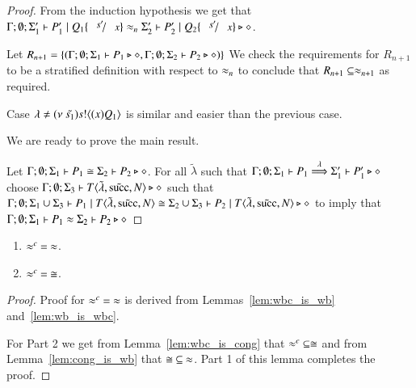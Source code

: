 \begin{proof}
	From the induction hypothesis we get that
	$\Gamma;\emptyset; \Sigma_1' \proves P_1' \Par Q_1 \subst{s'}{x} \wb_n \Sigma_2' \proves P_2' \Par Q_2 \subst{s'}{x} \hastype \Proc$.

	Let $R_{n+1} = \{(\Gamma; \emptyset; \Sigma_1 \vdash P_1 \triangleright \diamond, \Gamma; \emptyset; \Sigma_2 \vdash P_2 \triangleright \diamond)\}$
	We check the requirements for $R_{n+1}$ to be a stratified definition with respect
	to $\approx_n$ to conclude that $R_{n+1} \subseteq \approx_{n+1}$ as required.

	Case $\lambda \not= (\nu\ \tilde{s_1}) s ! \langle (x)Q_1 \rangle$ is similar and easier than the previous case.

	We are ready to prove the main result.

	Let $\Gamma; \emptyset; \Sigma_1 \vdash P_1 \cong \Sigma_2 \vdash P_2 \triangleright \diamond$.
	For all $\tilde{\lambda}$ such that $\Gamma; \emptyset; \Sigma_1 \vdash P_1 \stackrel{\lambda}{\Longrightarrow} \Sigma_1' \vdash P_1' \triangleright \diamond$
	choose $\Gamma; \emptyset; \Sigma_3 \vdash T\langle \tilde{\lambda}, \tilde{\textrm{succ}}, N \rangle \triangleright \diamond$ such that
	$\Gamma; \emptyset; \Sigma_1 \cup \Sigma_3 \vdash P_1 \;|\; T\langle \tilde{\lambda}, \tilde{\textrm{succ}}, N \rangle \cong \Sigma_2 \cup \Sigma_3 \vdash P_2 \;|\; T\langle \tilde{\lambda}, \tilde{\textrm{succ}}, N \rangle \triangleright \diamond$
	to imply that $\Gamma; \emptyset; \Sigma_1 \vdash P_1 \approx \Sigma_2 \vdash P_2 \triangleright \diamond$
\end{proof}




\begin{theorem}[Concidence]
	\begin{enumerate}
		\item	$\wbc\ =\ \wb$.
		\item	$\approx^{c}\ =\ \cong$.
	\end{enumerate}
\end{theorem}

\begin{proof}
	\noi Proof for $\wbc\ =\ \wb$ is derived from Lemmas~\ref{lem:wbc_is_wb} and~\ref{lem:wb_is_wbc}.

	\noi For Part 2 we get from Lemma~\ref{lem:wbc_is_cong} that $\approx^{c}\ \subseteq \cong$ and
	from Lemma~\ref{lem:cong_is_wb} that $\cong\ \subseteq\ \approx$. Part 1 of this lemma completes the proof.
\end{proof}

